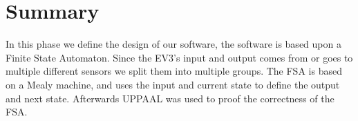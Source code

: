 \section{Summary}
In this phase we define the design of our software, the software is based upon a Finite State Automaton. Since the EV3's input and output comes from or goes to multiple different sensors we split them into multiple groups. The FSA is based on a Mealy machine, and uses the input and current state to define the output and next state. Afterwards UPPAAL was used to proof the correctness of the FSA.
